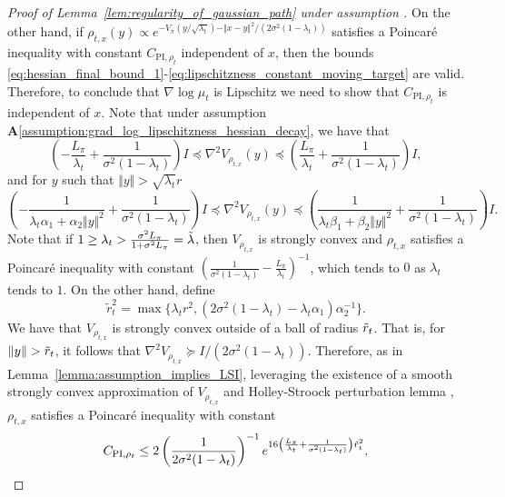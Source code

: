 \begin{proof}[Proof of Lemma~\ref{lem:regularity_of_gaussian_path} under assumption ]
On the other hand, if $\rho_{t, x}(y)\propto e^{-V_\pi(y/\sqrt{\lambda_t})-\Vert x-y\Vert^2/(2\sigma^2(1-\lambda_t))}$ satisfies a Poincaré inequality with constant $C_{\text{PI}, \rho_t}$ independent of $x$, then the bounds \eqref{eq:hessian_final_bound_1}-\eqref{eq:lipschitzness_constant_moving_target} are valid. Therefore, to conclude that $\nabla\log\mu_t$ is Lipschitz we need to show that $C_{\text{PI}, \rho_t}$ is independent of $x$. Note that under assumption \textbf{A}\ref{assumption:grad_log_lipschitzness_hessian_decay}, we have that
\begin{equation*}
    \left(-\frac{L_\pi}{\lambda_t} + \frac{1}{\sigma^2(1-\lambda_t)}\right) I\preccurlyeq\nabla^2 V_{\rho_{t, x}}(y) \preccurlyeq \left(\frac{L_\pi}{\lambda_t} + \frac{1}{\sigma^2(1-\lambda_t)}\right) I,
\end{equation*}
and for $y$ such that $\Vert y\Vert>\sqrt{\lambda_t }r$
\begin{equation*}
    \left( - \frac{1}{\lambda_t\alpha_1 +\alpha_2 \Vert y\Vert^{2}}+\frac{1}{\sigma^2(1-\lambda_t)}\right) I \preccurlyeq \nabla^2 V_{\rho_{t, x}} (y)\preccurlyeq \left(\frac{1}{\lambda_t\beta_1 +\beta_2 \Vert y\Vert^{2}}+\frac{1}{\sigma^2(1-\lambda_t)}\right) I.
\end{equation*}
Note that if $1\geq\lambda_t>\frac{\sigma^2 L_\pi}{1+\sigma^2L_\pi}= \Tilde{\lambda}$, then $V_{\rho_{t, x}}$ is strongly convex and $\rho_{t, x}$ satisfies a Poincaré inequality with constant $\left(\frac{1}{\sigma^2(1-\lambda_t)}-\frac{L_\pi}{\lambda_t}\right)^{-1}$, which tends to $0$ as $\lambda_t$ tends to $1$. On the other hand, define 
\begin{equation*}
    \tilde{r}_t^2 = \max \{\lambda_t r^2, (2\sigma^2(1-\lambda_t)-\lambda_t\alpha_1)\alpha_2^{-1}\}.
\end{equation*}
We have that $V_{\rho_{t, x}}$ is strongly convex outside of a ball of radius $\Tilde{r}_t$. That is, for $\Vert y\Vert>\Tilde{r}_t$, it follows that $\nabla^2 V_{\rho_{t, x}}\succcurlyeq I/(2\sigma^2(1-\lambda_t))$. Therefore, as in Lemma~\ref{lemma:assumption_implies_LSI}, leveraging the existence of a smooth strongly convex approximation of $V_{\rho_{t, x}}$ and Holley-Stroock perturbation lemma \citep{RefWorks:RefID:85-holley1987logarithmic}, $\rho_{t, x}$ satisfies a Poincaré inequality with constant 
\begin{equation}
    C_{\text{PI}, \rho_t} \leq 2 \left(\frac{1}{2\sigma^2(1-\lambda_t)}\right)^{-1} e^{16\left(\frac{L_\pi}{\lambda_t} + \frac{1}{\sigma^2(1-\lambda_t)}\right)\Tilde{r}_t^2}, \label{eq:bound_C_poincare_inequality}

\end{equation}
\end{proof}
